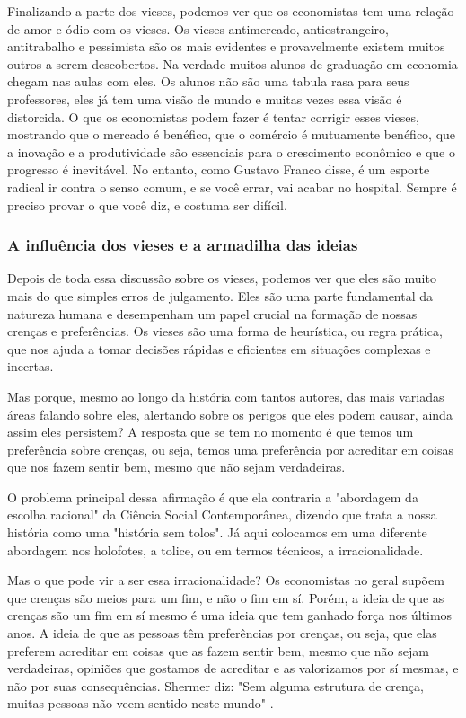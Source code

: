 Finalizando a parte dos vieses, podemos ver que os economistas tem uma relação de amor e ódio com os vieses. Os vieses antimercado, antiestrangeiro, antitrabalho e pessimista são os mais evidentes e provavelmente existem muitos outros a serem descobertos. Na verdade muitos alunos de graduação em economia chegam nas aulas com eles. Os alunos não são uma tabula rasa para seus professores, eles já tem uma visão de mundo e muitas vezes essa visão é distorcida. O que os economistas podem fazer é tentar corrigir esses vieses, mostrando que o mercado é benéfico, que o comércio é mutuamente benéfico, que a inovação e a produtividade são essenciais para o crescimento econômico e que o progresso é inevitável. No entanto, como Gustavo Franco disse, é um esporte radical ir contra o senso comum, e se você errar, vai acabar no hospital. Sempre é preciso provar o que você diz, e costuma ser difícil.

\subsubsection{A influência dos vieses e a armadilha das ideias}

Depois de toda essa discussão sobre os vieses, podemos ver que eles são muito mais do que simples erros de julgamento. Eles são uma parte fundamental da natureza humana e desempenham um papel crucial na formação de nossas crenças e preferências. Os vieses são uma forma de heurística, ou regra prática, que nos ajuda a tomar decisões rápidas e eficientes em situações complexas e incertas. 

Mas porque, mesmo ao longo da história com tantos autores, das mais variadas áreas falando sobre eles, alertando sobre os perigos que eles podem causar, ainda assim eles persistem? A resposta que se tem no momento é que temos um preferência sobre crenças, ou seja, temos uma preferência por acreditar em coisas que nos fazem sentir bem, mesmo que não sejam verdadeiras. 

O problema principal dessa afirmação é que ela contraria a "abordagem da escolha racional" da Ciência Social Contemporânea, dizendo que trata a nossa história como uma "história sem tolos". Já aqui colocamos em uma diferente abordagem nos holofotes, a tolice, ou em termos técnicos, a irracionalidade.

Mas o que pode vir a ser essa irracionalidade? Os economistas no geral supõem que crenças são meios para um fim, e não o fim em sí. Porém, a ideia de que as crenças são um fim em sí mesmo é uma ideia que tem ganhado força nos últimos anos. A ideia de que as pessoas têm preferências por crenças, ou seja, que elas preferem acreditar em coisas que as fazem sentir bem, mesmo que não sejam verdadeiras, opiniões que gostamos de acreditar e as valorizamos por sí mesmas, e não por suas consequências. Shermer diz: "Sem alguma estrutura de crença, muitas pessoas não veem sentido neste mundo" \cite{shermer2002people}.

